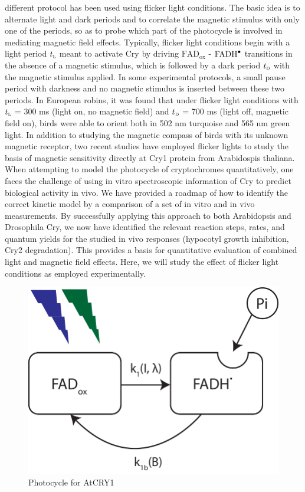 \documentclass[twoside,twocolumn,9pt]{article}
\begin{document}
different protocol has been used using flicker light conditions. The basic idea is to alternate light and dark periods and to
correlate the magnetic stimulus with only one of the periods, so as to probe which part of the photocycle is involved in mediating
magnetic field effects. Typically, flicker light conditions begin with a light period $t_{\textsc{l}}$ meant to activate Cry by
driving $\text{FAD}_{\text{ox}}$ - $\ce{FADH^{.}}$ transitions in the absence of a magnetic stimulus, which is followed by a dark
period $t_{\textsc{d}}$ with the magnetic stimulus applied. In some experimental protocols, a small pause period with darkness and
no magnetic stimulus is inserted between these two periods. In European robins, it was found that under flicker light conditions
with $t_{\textsc{l}}$ = 300 ms (light on, no magnetic field) and $t_{\textsc{d}}$ = 700 ms (light off, magnetic field on), birds
were able to orient both in 502 nm turquoise and 565 nm green light.
In addition to studying the magnetic compass of birds with its unknown magnetic receptor, two recent studies have employed flicker
lights to study the basis of magnetic sensitivity directly at Cry1 protein from Arabidospis thaliana.
When attempting to model the photocycle of cryptochromes quantitatively, one faces the challenge of using in vitro spectroscopic
information of Cry to predict biological activity in vivo. We have provided a roadmap of how to identify the correct kinetic model
by a comparison of a set of in vitro and in vivo measurements. By successfully applying this approach to both Arabidopsis
\cite{Procopio2016} and Drosophila Cry, \cite{Arthaut2017} we now have identified the relevant reaction steps, rates, and quantum
yields for the studied in vivo responses (hypocotyl growth inhibition, Cry2 degradation). This provides a basis for quantitative
evaluation of combined light and magnetic field effects. Here, we will study the effect of flicker light conditions as employed
experimentally. \cite{Pooam2019, Wiltschko2014}
\begin{figure}[h]
	\centering
	\includegraphics[width = 8.3 cm, height = 5.553 cm]{photocycleTwoState.pdf}
	\caption{Photocycle for AtCRY1}
	\label{fig:photocycle}
\end{figure}
\end{document}
